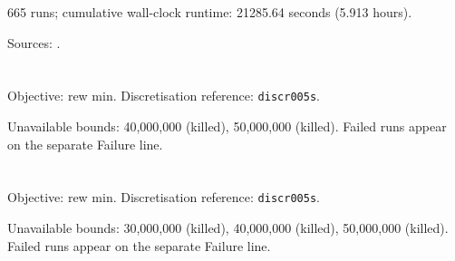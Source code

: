 \documentclass[a4paper,10pt]{article}
\begin{document}
665 runs; cumulative wall-clock runtime: 21285.64 seconds (5.913 hours).

Sources: \texttt{}.

\noindent\begin{minipage}{\linewidth}
\section*{\small\texttt{}}
Objective: rew min. Discretisation reference: \texttt{discr005s}.

\begin{minipage}[t]{0.48\linewidth}\centering

\end{minipage}
\hfill
\begin{minipage}[t]{0.48\linewidth}\centering

\end{minipage}
\par\medskip
Unavailable bounds: 40,000,000 (killed), 50,000,000 (killed). Failed runs appear on the separate Failure line.

\end{minipage}\par\bigskip
\noindent\begin{minipage}{\linewidth}
\section*{\small\texttt{}}
Objective: rew min. Discretisation reference: \texttt{discr005s}.

\begin{minipage}[t]{0.48\linewidth}\centering

\end{minipage}
\hfill
\begin{minipage}[t]{0.48\linewidth}\centering

\end{minipage}
\par\medskip
Unavailable bounds: 30,000,000 (killed), 40,000,000 (killed), 50,000,000 (killed). Failed runs appear on the separate Failure line.

\end{minipage}\par\bigskip
\end{document}
